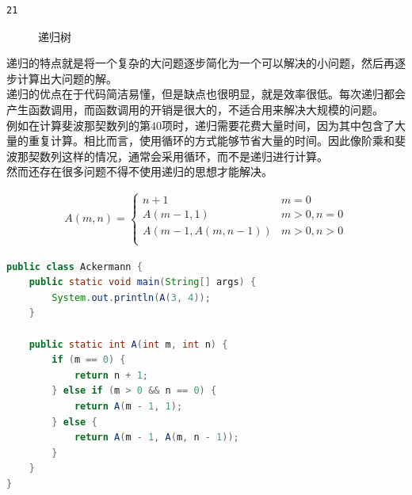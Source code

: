 \begin{tcolorbox}
	\begin{verbatim}
21
	\end{verbatim}
\end{tcolorbox}

\begin{figure}[H]
	\centering
	\caption{递归树}
\end{figure}

递归的特点就是将一个复杂的大问题逐步简化为一个可以解决的小问题，然后再逐步计算出大问题的解。\\

递归的优点在于代码简洁易懂，但是缺点也很明显，就是效率很低。每次递归都会产生函数调用，而函数调用的开销是很大的，不适合用来解决大规模的问题。\\

例如在计算斐波那契数列的第40项时，递归需要花费大量时间，因为其中包含了大量的重复计算。相比而言，使用循环的方式能够节省大量的时间。因此像阶乘和斐波那契数列这样的情况，通常会采用循环，而不是递归进行计算。\\

然而还存在很多问题不得不使用递归的思想才能解决。\\


\begin{align}\nonumber
	A(m, n) =
	\begin{cases}
		n + 1             & m = 0        \\
		A(m-1, 1)         & m > 0, n = 0 \\
		A(m-1, A(m, n-1)) & m > 0, n > 0 \\
	\end{cases}
\end{align}

\begin{lstlisting}[language=Java]
public class Ackermann {
	public static void main(String[] args) {
		System.out.println(A(3, 4));
	}

	public static int A(int m, int n) {
		if (m == 0) {
			return n + 1;
		} else if (m > 0 && n == 0) {
			return A(m - 1, 1);
		} else {
			return A(m - 1, A(m, n - 1));
		}
	}
}
\end{lstlisting}

